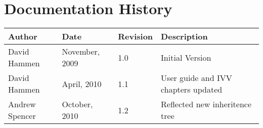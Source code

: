 
\section{Documentation History}
\begin{tabular}{||l|l|l|l|} \hline
{\bf Author } & {\bf Date} & {\bf Revision} & {\bf Description} \\ \hline \hline
 David Hammen & November, 2009 & 1.0 & Initial Version \\
 David Hammen & April, 2010 & 1.1 & User guide and IVV chapters updated \\
 Andrew Spencer & October, 2010 & 1.2 & Reflected new inheritence tree \\
\hline
\end{tabular}
